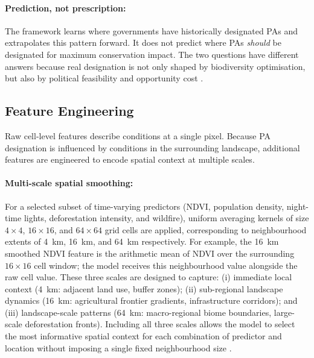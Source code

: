 \documentclass[12pt]{article}
\theoremstyle{break}
\begin{document}
\paragraph{Prediction, not prescription:}
The framework learns where governments have historically designated PAs and
extrapolates this pattern forward. It does not predict where PAs \emph{should} be
designated for maximum conservation impact. The two questions have different answers because real designation is not only shaped
by biodiversity optimisation, but also by political feasibility and opportunity cost \citep{joppa2009, venter2018}.

\subsection{Feature Engineering}
\label{sec:features}

Raw cell-level features describe conditions at a single pixel. Because PA designation
is influenced by conditions in the surrounding landscape, additional features are engineered to encode spatial
context at multiple scales.

\paragraph{Multi-scale spatial smoothing:}
For a selected subset of time-varying predictors (NDVI, population density, night-time
lights, deforestation intensity, and wildfire), uniform averaging kernels of size
$4 \times 4$, $16 \times 16$, and $64 \times 64$ grid cells are applied, corresponding
to neighbourhood extents of 4~km, 16~km, and 64~km respectively. For example, the
16~km smoothed NDVI feature is the arithmetic mean of NDVI over the surrounding
$16 \times 16$ cell window; the model receives this neighbourhood value alongside the
raw cell value. These three scales are designed to capture: (i) immediate local context (4~km: adjacent land use, buffer
zones); (ii) sub-regional landscape dynamics (16~km: agricultural frontier gradients,
infrastructure corridors); and (iii) landscape-scale patterns (64~km: macro-regional
biome boundaries, large-scale deforestation fronts). Including all three scales allows
the model to select the most informative spatial context for each combination of
predictor and location without imposing a single fixed neighbourhood size
\citep{collart2025, mcgarigal2016}.
\end{document}
